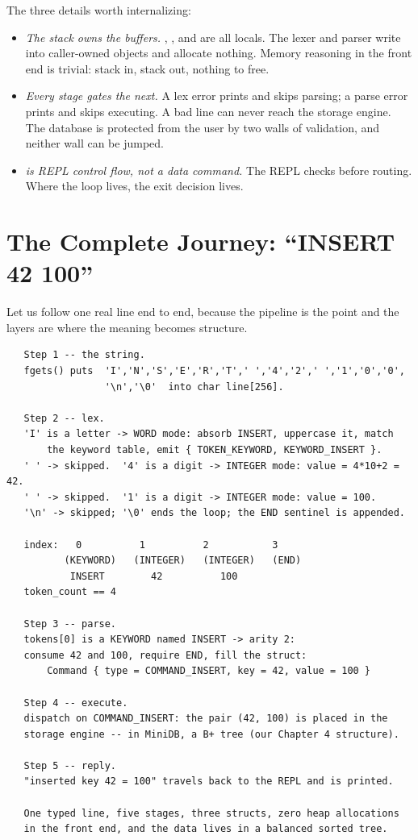 The three details worth internalizing:

\begin{itemize}
  \item \emph{The stack owns the buffers.} ,
    , and  are all locals. The
    lexer and parser write into caller-owned objects and allocate
    nothing. Memory reasoning in the front end is trivial: stack in,
    stack out, nothing to free.
  \item \emph{Every stage gates the next.} A lex error prints and
    skips parsing; a parse error prints and skips executing. A bad
    line can never reach the storage engine. The database is protected
    from the user by two walls of validation, and neither wall can be
    jumped.
  \item \emph{ is REPL control flow, not a data command.}
    The REPL checks  before routing.
    Where the loop lives, the exit decision lives.
\end{itemize}

\section{The Complete Journey: ``INSERT 42 100''}

Let us follow one real line end to end, because the pipeline is the
point and the layers are where the meaning becomes structure.

\begin{verbatim}
   Step 1 -- the string.
   fgets() puts  'I','N','S','E','R','T',' ','4','2',' ','1','0','0',
                 '\n','\0'  into char line[256].

   Step 2 -- lex.
   'I' is a letter -> WORD mode: absorb INSERT, uppercase it, match
       the keyword table, emit { TOKEN_KEYWORD, KEYWORD_INSERT }.
   ' ' -> skipped.  '4' is a digit -> INTEGER mode: value = 4*10+2 = 42.
   ' ' -> skipped.  '1' is a digit -> INTEGER mode: value = 100.
   '\n' -> skipped; '\0' ends the loop; the END sentinel is appended.

   index:   0          1          2           3
          (KEYWORD)   (INTEGER)   (INTEGER)   (END)
           INSERT        42          100
   token_count == 4

   Step 3 -- parse.
   tokens[0] is a KEYWORD named INSERT -> arity 2:
   consume 42 and 100, require END, fill the struct:
       Command { type = COMMAND_INSERT, key = 42, value = 100 }

   Step 4 -- execute.
   dispatch on COMMAND_INSERT: the pair (42, 100) is placed in the
   storage engine -- in MiniDB, a B+ tree (our Chapter 4 structure).

   Step 5 -- reply.
   "inserted key 42 = 100" travels back to the REPL and is printed.

   One typed line, five stages, three structs, zero heap allocations
   in the front end, and the data lives in a balanced sorted tree.
\end{verbatim}

